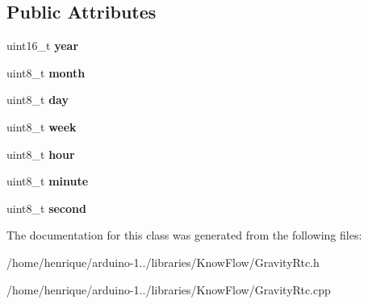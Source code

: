 \subsection*{Public Attributes}
\begin{DoxyCompactItemize}
\item 
uint16\+\_\+t {\bfseries year}\hypertarget{class_gravity_rtc_aee78ae1d9bb609d28646cc1aebce95da}{}\label{class_gravity_rtc_aee78ae1d9bb609d28646cc1aebce95da}

\item 
uint8\+\_\+t {\bfseries month}\hypertarget{class_gravity_rtc_ab2324ae4aed5602bde5edd1c3ff87d7e}{}\label{class_gravity_rtc_ab2324ae4aed5602bde5edd1c3ff87d7e}

\item 
uint8\+\_\+t {\bfseries day}\hypertarget{class_gravity_rtc_a2ff22b91244afd426e97c87662a012de}{}\label{class_gravity_rtc_a2ff22b91244afd426e97c87662a012de}

\item 
uint8\+\_\+t {\bfseries week}\hypertarget{class_gravity_rtc_a31d8fcf37eb319e41b21d225f5742596}{}\label{class_gravity_rtc_a31d8fcf37eb319e41b21d225f5742596}

\item 
uint8\+\_\+t {\bfseries hour}\hypertarget{class_gravity_rtc_a48b1fcd948714dd6dad2d6affe4c47e8}{}\label{class_gravity_rtc_a48b1fcd948714dd6dad2d6affe4c47e8}

\item 
uint8\+\_\+t {\bfseries minute}\hypertarget{class_gravity_rtc_a115cfa32bdf083b2f5ff5726596c1452}{}\label{class_gravity_rtc_a115cfa32bdf083b2f5ff5726596c1452}

\item 
uint8\+\_\+t {\bfseries second}\hypertarget{class_gravity_rtc_af282a070e519ff7a36c4472494cefe8d}{}\label{class_gravity_rtc_af282a070e519ff7a36c4472494cefe8d}

\end{DoxyCompactItemize}


The documentation for this class was generated from the following files\+:\begin{DoxyCompactItemize}
\item 
/home/henrique/arduino-\/1../libraries/\+Know\+Flow/Gravity\+Rtc.\+h\item 
/home/henrique/arduino-\/1../libraries/\+Know\+Flow/Gravity\+Rtc.\+cpp\end{DoxyCompactItemize}
